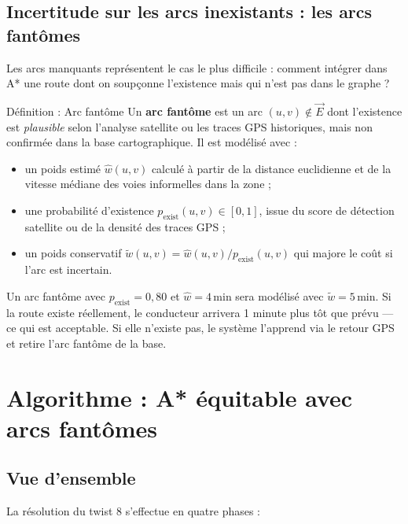 \documentclass[12pt,a4paper]{article}
\theoremstyle{definition}
\theoremstyle{remark}
\begin{document}
\subsection{Incertitude sur les arcs inexistants : les arcs fantômes}

Les arcs manquants représentent le cas le plus difficile : comment
intégrer dans A* une route dont on soupçonne l'existence mais qui
n'est pas dans le graphe ?

\begin{defbox}{Définition : Arc fantôme}
Un \textbf{arc fantôme} est un arc $(u, v) \notin \vec{E}$ dont
l'existence est \emph{plausible} selon l'analyse satellite ou les
traces GPS historiques, mais non confirmée dans la base cartographique.
Il est modélisé avec :
\begin{itemize}[leftmargin=1.5em]
  \item un poids estimé $\hat{w}(u,v)$ calculé à partir de la
    distance euclidienne et de la vitesse médiane des voies informelles
    dans la zone ;
  \item une probabilité d'existence $p_\text{exist}(u,v) \in [0,1]$,
    issue du score de détection satellite ou de la densité des traces GPS ;
  \item un poids conservatif $\tilde{w}(u,v) = \hat{w}(u,v) /
    p_\text{exist}(u,v)$ qui majore le coût si l'arc est incertain.
\end{itemize}
\end{defbox}

Un arc fantôme avec $p_\text{exist} = 0{,}80$ et $\hat{w} = 4\,\text{min}$
sera modélisé avec $\tilde{w} = 5\,\text{min}$. Si la route existe
réellement, le conducteur arrivera 1 minute plus tôt que prévu ---
ce qui est acceptable. Si elle n'existe pas, le système l'apprend
via le retour GPS et retire l'arc fantôme de la base.

\newpage

\section{Algorithme : A* équitable avec arcs fantômes}

\subsection{Vue d'ensemble}

La résolution du twist 8 s'effectue en quatre phases :
\end{document}
